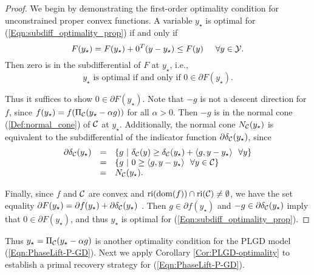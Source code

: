 \begin{proof}
We begin by demonstrating the first-order optimality condition for unconstrained proper convex functions.  A variable $y_\star$ is optimal for (\ref{Eqn:subdiff_optimality_prop}) if and only if
\begin{equation}
F(y_\star) = F(y_\star) + 0^T(y - y_\star)  \leq F(y)	\hspace{.5cm} \forall y \in {\mathcal Y}.
\end{equation}
Then zero is in the subdifferential of $F$ at $y_\star$, i.e.,
\begin{equation}
y_\star \text{ is optimal if and only if } 0 \in \partial F(y_\star).
\end{equation}

Thus it suffices to show $0 \in \partial F(y_\star)$.  Note that $-g$ is not a descent direction for $f$, since $f(y_\star) = f(\Pi_{\mathcal C}(y_\star - \alpha g))$ for all $\alpha >0$.  Then $-g$ is in the normal cone (\ref{Def:normal_cone}) of ${\mathcal C}$ at $y_\star$.  Additionally, the normal cone $N_{\mathcal C}(y_\star)$ is equivalent to the subdifferential of the indicator function $\partial \delta_{\mathcal C}(y_\star)$, since
\begin{equation}
\begin{array}{rcl}
\partial \delta_{\mathcal C}(y_\star)
	&	=	&	\{ g \ | \ \delta_{\mathcal C}(y) \geq \delta_{\mathcal C}(y_\star) + \langle g, y - y_\star \rangle \ \ \forall y \}	\\
	&	=	& \{ g \ | \ 0 \geq  \langle g, y - y_\star \rangle \ \ \forall y \in {\mathcal C} \}	\\
	&	=	&	N_{\mathcal C}(y_\star).
\end{array}
\end{equation}

Finally, since $f$ and ${\mathcal C}$ are convex and $\textnormal{ri}( \textnormal{dom} (f)) \cap \textnormal{ri}({\mathcal C}) \neq \emptyset$, we have the set equality $\partial F(y_\star) = \partial f(y_\star) + \partial \delta_{\mathcal C}(y_\star)$ \cite[Theorem 23.8]{rockafellar1970convex}.  Then $g \in \partial f(y_\star)$ and $-g \in \partial \delta_{\mathcal C}(y_\star)$ imply that $0 \in \partial F(y_\star)$, and thus $y_\star$ is optimal for (\ref{Eqn:subdiff_optimality_prop}).

\end{proof}

Thus $y_\star = \Pi_{\mathcal C}(y_\star - \alpha g)$ is another optimality condition for the PLGD model (\ref{Eqn:PhaseLift-P-GD}).  Next we apply Corollary \ref{Cor:PLGD-optimality} to establish a primal recovery strategy for (\ref{Eqn:PhaseLift-P-GD}).


